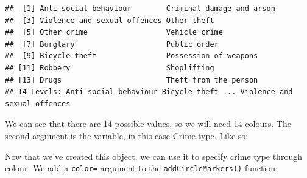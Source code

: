 \documentclass[]{book}
\newenvironment{Shaded}{\begin{snugshade}}{\end{snugshade}}
\newcommand{\CommentTok}[1]{\textcolor[rgb]{0.56,0.35,0.01}{\textit{#1}}}
\newcommand{\DataTypeTok}[1]{\textcolor[rgb]{0.13,0.29,0.53}{#1}}
\newcommand{\DecValTok}[1]{\textcolor[rgb]{0.00,0.00,0.81}{#1}}
\newcommand{\FloatTok}[1]{\textcolor[rgb]{0.00,0.00,0.81}{#1}}
\newcommand{\KeywordTok}[1]{\textcolor[rgb]{0.13,0.29,0.53}{\textbf{#1}}}
\newcommand{\NormalTok}[1]{#1}
\newcommand{\OperatorTok}[1]{\textcolor[rgb]{0.81,0.36,0.00}{\textbf{#1}}}
\newcommand{\StringTok}[1]{\textcolor[rgb]{0.31,0.60,0.02}{#1}}
\begin{document}
\begin{verbatim}
##  [1] Anti-social behaviour        Criminal damage and arson   
##  [3] Violence and sexual offences Other theft                 
##  [5] Other crime                  Vehicle crime               
##  [7] Burglary                     Public order                
##  [9] Bicycle theft                Possession of weapons       
## [11] Robbery                      Shoplifting                 
## [13] Drugs                        Theft from the person       
## 14 Levels: Anti-social behaviour Bicycle theft ... Violence and sexual offences
\end{verbatim}

We can see that there are 14 possible values, so we will need 14 colours. The second argument is the variable, in this case Crime.type. Like so:

\begin{Shaded}
\end{Shaded}

Now that we've created this object, we can use it to specify crime type through colour. We add a \texttt{color=} argument to the \texttt{addCircleMarkers()} function:

\begin{Shaded}
\end{Shaded}
\end{document}
